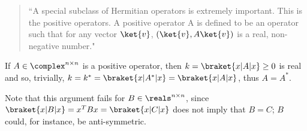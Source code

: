 %
%
\begin{quote}
``A special subclass of Hermitian operators is extremely important. This is the
positive operators. A positive operator A is defined to be an operator such that
for any vector $\ket{v}$, $\left( \ket{v}, A \ket{v} \right)$ is a real,
non-negative number."
\end{quote}
\par If $A \in \complex^{n \times n}$ is a positive operator, then $k =
\braket{x|A|x} \ge 0$ is real and so, trivially, $k = k^* = \braket{x|A^*|x} =
\braket{x|A|x}$, thus $A = A^*$.

\par Note that this argument fails for $B \in \reals^{n \times n}$, since
$\braket{x|B|x} = x^T B x = \braket{x|C|x}$ does not imply that $B = C$; $B$
could, for instance, be anti-symmetric.
